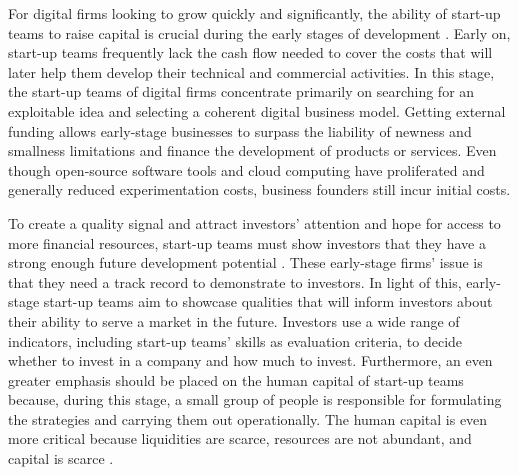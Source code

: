 \documentclass[12pt]{article}
\begin{document}
For digital firms looking to grow quickly and significantly, the ability of start-up teams to raise capital is crucial during the early stages of development \citep{rosenbusch2013does}. Early on, start-up teams frequently lack the cash flow needed to cover the costs that will later help them develop their technical and commercial activities. In this stage, the start-up teams of digital firms concentrate primarily on searching for an exploitable idea and selecting a coherent digital business model. Getting external funding allows early-stage businesses to surpass the liability of newness and smallness limitations and finance the development of products or services. Even though open-source software tools and cloud computing have proliferated and generally reduced experimentation costs, business founders still incur initial costs.

To create a quality signal and attract investors' attention and hope for access to more financial resources, start-up teams must show investors that they have a strong enough future development potential \citep{ko2018signaling}. These early-stage firms' issue is that they need a track record to demonstrate to investors. In light of this, early-stage start-up teams aim to showcase qualities that will inform investors about their ability to serve a market in the future. Investors use a wide range of indicators, including start-up teams' skills as evaluation criteria, to decide whether to invest in a company and how much to invest. Furthermore, an even greater emphasis should be placed on the human capital of start-up teams because, during this stage, a small group of people is responsible for formulating the strategies and carrying them out operationally. The human capital is even more critical because liquidities are scarce, resources are not abundant, and capital is scarce \citep{beckman2007early}.
\end{document}
